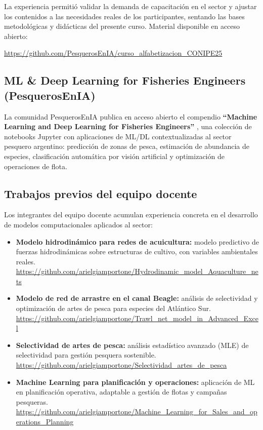 \documentclass[12pt,a4paper]{article}
\begin{document}
La experiencia permitió validar la demanda de capacitación en el sector y ajustar los contenidos a las necesidades reales de los participantes, sentando las bases metodológicas y didácticas del presente curso. Material disponible en acceso abierto:
\begin{center}
  \url{https://github.com/PesquerosEnIA/curso_alfabetizacion_CONIPE25}
\end{center}

\subsection{ML \& Deep Learning for Fisheries Engineers (PesquerosEnIA)}

La comunidad PesquerosEnIA publica en acceso abierto el compendio \textbf{``Machine Learning and Deep Learning for Fisheries Engineers''} \parencite{PesquerosEnIAML2024}, una colección de notebooks Jupyter con aplicaciones de ML/DL contextualizadas al sector pesquero argentino: predicción de zonas de pesca, estimación de abundancia de especies, clasificación automática por visión artificial y optimización de operaciones de flota.

\subsection{Trabajos previos del equipo docente}

Los integrantes del equipo docente acumulan experiencia concreta en el desarrollo de modelos computacionales aplicados al sector:

\begin{itemize}
  \item \textbf{Modelo hidrodinámico para redes de acuicultura:} modelo predictivo de fuerzas hidrodinámicas sobre estructuras de cultivo, con variables ambientales reales.\\
        \url{https://github.com/arielgiamportone/Hydrodinamic_model_Aquaculture_nets}

  \item \textbf{Modelo de red de arrastre en el canal Beagle:} análisis de selectividad y optimización de artes de pesca para especies del Atlántico Sur.\\
        \url{https://github.com/arielgiamportone/Trawl_net_model_in_Advanced_Excel}

  \item \textbf{Selectividad de artes de pesca:} análisis estadístico avanzado (MLE) de selectividad para gestión pesquera sostenible.\\
        \url{https://github.com/arielgiamportone/Selectividad_artes_de_pesca}

  \item \textbf{Machine Learning para planificación y operaciones:} aplicación de ML en planificación operativa, adaptable a gestión de flotas y campañas pesqueras.\\
        \url{https://github.com/arielgiamportone/Machine_Learning_for_Sales_and_operations_Planning}
\end{itemize}
\end{document}
